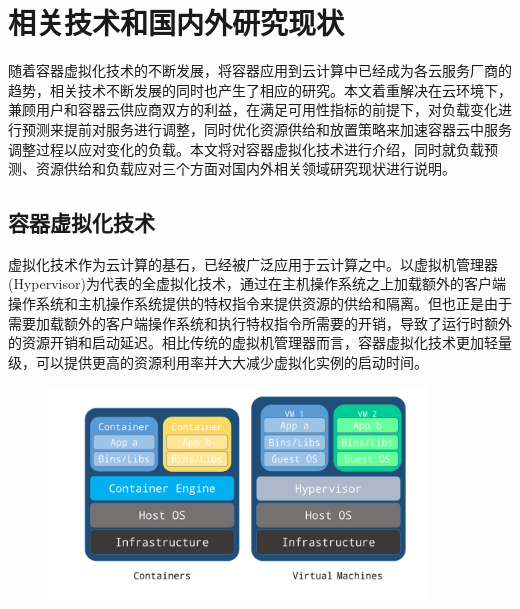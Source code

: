 
\chapter{相关技术和国内外研究现状}
\label{chap:art_of_state}
随着容器虚拟化技术的不断发展，将容器应用到云计算中已经成为各云服务厂商的趋势，相关技术不断发展的同时也产生了相应的研究。本文着重解决在云环境下，兼顾用户和容器云供应商双方的利益，在满足可用性指标的前提下，对负载变化进行预测来提前对服务进行调整，同时优化资源供给和放置策略来加速容器云中服务调整过程以应对变化的负载。本文将对容器虚拟化技术进行介绍，同时就负载预测、资源供给和负载应对三个方面对国内外相关领域研究现状进行说明。

\section{容器虚拟化技术}
虚拟化技术作为云计算的基石，已经被广泛应用于云计算之中\cite{zhang2010cloud}。以虚拟机管理器(Hypervisor)为代表的全虚拟化技术，通过在主机操作系统之上加载额外的客户端操作系统和主机操作系统提供的特权指令来提供资源的供给和隔离。但也正是由于需要加载额外的客户端操作系统和执行特权指令所需要的开销，导致了运行时额外的资源开销和启动延迟\cite{bernstein2014containers}。相比传统的虚拟机管理器而言，容器虚拟化技术更加轻量级，可以提供更高的资源利用率并大大减少虚拟化实例的启动时间\cite{soltesz2007container}。

\begin{figure}[h]
\centering
\includegraphics[width=0.9\textwidth]{./figure/container-vm}
\end{figure}

